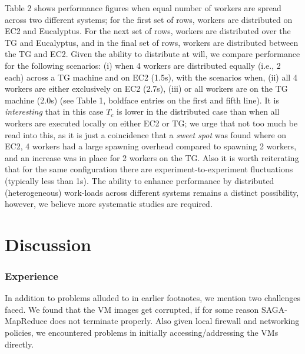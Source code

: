 \documentclass[conference,final]{IEEEtran}
\newcommand{\sagamapreduce }{SAGA-MapReduce }
\begin{document}
Table 2 shows performance figures when equal number of workers are
spread across two different systems; for the first set of rows,
workers are distributed on EC2 and Eucalyptus. For the next set of
rows, workers are distributed over the TG and Eucalyptus, and in the
final set of rows, workers are distributed between the TG and EC2.
Given the ability to distribute at will, we compare performance for
the following scenarios: (i) when 4 workers are distributed equally
(i.e., 2 each) across a TG machine and on EC2 (1.5s), with the
scenarios when, (ii) all 4 workers are either exclusively on EC2
(2.7s), (iii) or all workers are on the TG machine (2.0s) (see Table
1, boldface entries on the first and fifth line). It is {\it
  interesting} that in this case $T_c$ is lower in the distributed
case than when all workers are executed locally on either EC2 or TG;
we urge that not too much be read into this, as it is just a
coincidence that a {\it sweet spot} was found where on EC2, 4 workers
had a large spawning overhead compared to spawning 2 workers, and an
increase was in place for 2 workers on the TG. Also it is worth
reiterating that for the same configuration there are
experiment-to-experiment fluctuations (typically less than 1s).  The
ability to enhance performance by distributed (heterogeneous)
work-loads across different systems remains a distinct possibility,
however, we believe more systematic studies are required.

\section{Discussion}

\subsubsection*{Experience}

In addition to problems alluded to in earlier footnotes, we mention
two challenges  faced. We found that the VM images get corrupted, if for
some reason \sagamapreduce does not terminate properly. Also given
local firewall and networking policies, we encountered problems in
initially accessing/addressing the VMs directly.
\end{document}
